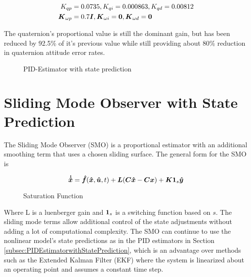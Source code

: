 \begin{equation}
  \begin{aligned}
    K_{qp} &= 0.0735, K_{qi} = 0.000863, K_{qd} = 0.00812 \\
    \boldsymbol{K}_{\omega p} &= 0.7 \boldsymbol{I}, \boldsymbol{K}_{\omega i} = \boldsymbol{0}, \boldsymbol{K}_{\omega d} = \boldsymbol{0}
  \end{aligned}
\end{equation}

The quaternion's proportional value is still the dominant gain, but has been reduced by 92.5\% of it's previous value while still providing about 80\% reduction in quaternion attitude error rates.

\begin{figure}[H]
  \centerline{}
  \caption{PID-Estimator with state prediction}
  \label{fig:PIDEstimatorwithstateprediction}
\end{figure}


\section{Sliding Mode Observer with State Prediction}
\label{sec:SlidingModeObserverwithStatePrediction}

The Sliding Mode Observer (SMO) is a proportional estimator with an additional smoothing term that uses a chosen sliding surface.  The general form for the SMO is

\begin{equation}
  \boldsymbol{\dot{\hat{x}}} = \boldsymbol{\hat{f}}(\boldsymbol{\hat{x}}, \boldsymbol{\hat{u}}, t) + \boldsymbol{L}(\boldsymbol{C}\boldsymbol{\hat{x}} - \boldsymbol{C}\boldsymbol{x}) + \boldsymbol{K}\boldsymbol{1}_s\boldsymbol{\hat{y}}
  \label{eqn:SMOContinuous}
\end{equation}

\begin{figure}[ht]
  \centerline{}
  \caption{Saturation Function}
  \label{fig:SaturationFunction}
\end{figure}


Where L is a luenberger gain and $\boldsymbol{1}_s$ is a switching function based on $s$.  The sliding mode terms allow additional control of the state adjustments without adding a lot of computational complexity.  The SMO can continue to use the nonlinear model's state predictions as in the PID estimators in Section \ref{subsec:PIDEstimatorwithStatePrediction}, which is an advantage over methods such as the Extended Kalman Filter (EKF) where the system is linearized about an operating point and assumes a constant time step.

